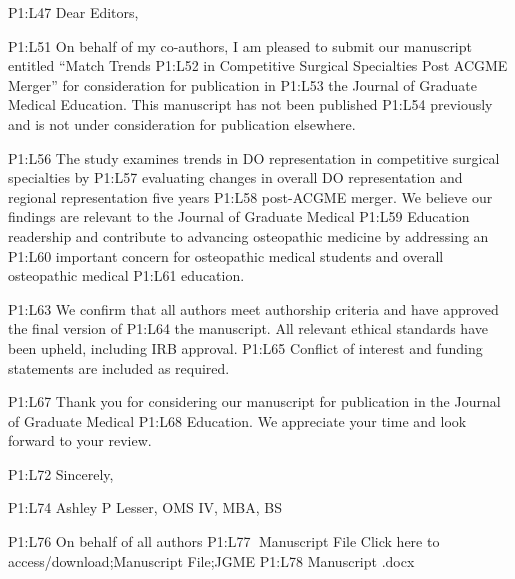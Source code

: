 P1:L47 Dear Editors,

P1:L51 On behalf of my co-authors, I am pleased to submit our manuscript
entitled ``Match Trends P1:L52 in Competitive Surgical Specialties Post
ACGME Merger'' for consideration for publication in P1:L53 the Journal
of Graduate Medical Education. This manuscript has not been published
P1:L54 previously and is not under consideration for publication
elsewhere.

P1:L56 The study examines trends in DO representation in competitive
surgical specialties by P1:L57 evaluating changes in overall DO
representation and regional representation five years P1:L58 post-ACGME
merger. We believe our findings are relevant to the Journal of Graduate
Medical P1:L59 Education readership and contribute to advancing
osteopathic medicine by addressing an P1:L60 important concern for
osteopathic medical students and overall osteopathic medical P1:L61
education.

P1:L63 We confirm that all authors meet authorship criteria and have
approved the final version of P1:L64 the manuscript. All relevant
ethical standards have been upheld, including IRB approval. P1:L65
Conflict of interest and funding statements are included as required.

P1:L67 Thank you for considering our manuscript for publication in the
Journal of Graduate Medical P1:L68 Education. We appreciate your time
and look forward to your review.

P1:L72 Sincerely,

P1:L74 Ashley P Lesser, OMS IV, MBA, BS

P1:L76 On behalf of all authors P1:L77 Manuscript File Click here to
access/download;Manuscript File;JGME P1:L78 Manuscript .docx

